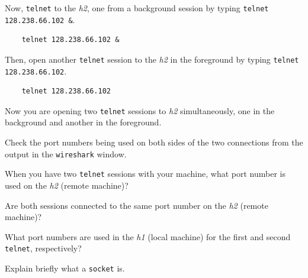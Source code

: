 \documentclass{UTNetLab}
\begin{document}
Now, \lstinline{telnet} to the \textit{h2}, one from a background session by typing \lstinline{telnet 128.238.66.102 &}.

\begin{lstlisting}
	telnet 128.238.66.102 &
\end{lstlisting}

Then, open another \lstinline{telnet} session to the \textit{h2} in the foreground by typing \lstinline{telnet 128.238.66.102}.

\begin{lstlisting}
	telnet 128.238.66.102
\end{lstlisting}

Now you are opening two \lstinline{telnet} sessions to \textit{h2} simultaneously, one in the background and another in the foreground.

Check the port numbers being used on both sides of the two connections from the output in the \lstinline{wireshark} window.

\begin{report}
    \item When you have two \lstinline{telnet} sessions with your machine, what port number is used on the \textit{h2} (remote machine)?

    \item Are both sessions connected to the same port number on the \textit{h2} (remote machine)?

    \item What port numbers are used in the \textit{h1} (local machine) for the first and second \lstinline{telnet}, respectively?

    \item Explain briefly what a \lstinline{socket} is.
\end{report}
\end{document}
